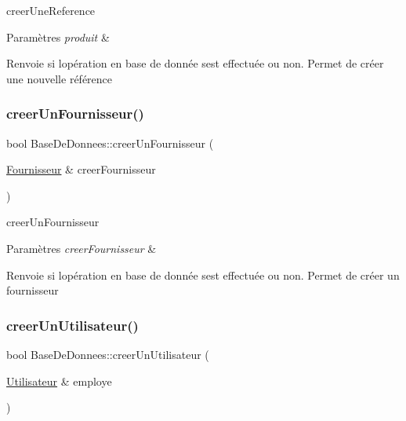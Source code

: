 creer\+Une\+Reference 


\begin{DoxyParams}{Paramètres}
{\em produit} & \\
\hline
\end{DoxyParams}
\begin{DoxyReturn}{Renvoie}
si l\textquotesingle{}opération en base de donnée s\textquotesingle{}est effectuée ou non. Permet de créer une nouvelle référence 
\end{DoxyReturn}
\mbox{\label{class_base_de_donnees_a81715fc3632e6533d9c66a66c62e897b}} 
\subsubsection{\texorpdfstring{creer\+Un\+Fournisseur()}{creerUnFournisseur()}}
{\footnotesize\ttfamily bool Base\+De\+Donnees\+::creer\+Un\+Fournisseur (\begin{DoxyParamCaption}\item[{\mbox{\hyperlink{class_fournisseur}{Fournisseur}} \&}]{creer\+Fournisseur }\end{DoxyParamCaption})}



creer\+Un\+Fournisseur 


\begin{DoxyParams}{Paramètres}
{\em creer\+Fournisseur} & \\
\hline
\end{DoxyParams}
\begin{DoxyReturn}{Renvoie}
si l\textquotesingle{}opération en base de donnée s\textquotesingle{}est effectuée ou non. Permet de créer un fournisseur 
\end{DoxyReturn}
\mbox{\label{class_base_de_donnees_acc7f10ab9b4699eaa495fa7829c0cfbd}} 
\subsubsection{\texorpdfstring{creer\+Un\+Utilisateur()}{creerUnUtilisateur()}}
{\footnotesize\ttfamily bool Base\+De\+Donnees\+::creer\+Un\+Utilisateur (\begin{DoxyParamCaption}\item[{\mbox{\hyperlink{class_utilisateur}{Utilisateur}} \&}]{employe }\end{DoxyParamCaption})}



